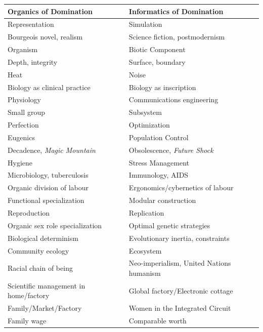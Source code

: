 \documentclass[DIV=12,%
               BCOR=10mm,%
               headinclude=false,%
               footinclude=false,open=any,%
               fontsize=11pt,%
               twoside,%
               paper=210mm:11in]%
               {scrbook}
\newcommand*{\Slash}{\slash\hspace{0pt}}
\begin{document}
\begin{table}[htbp!]
 \begin{minipage}[t]{\textwidth}
\begin{tabularx}{\textwidth}{|X|X|}
\hline
\relax  Organics of Domination   &  Informatics of Domination  \\
\hline
\relax  Representation   &  Simulation  \\
\relax  Bourgeois novel, realism   &  Science fiction, postmodernism  \\
\relax  Organism   &  Biotic Component  \\
\relax  Depth, integrity   &  Surface, boundary  \\
\relax  Heat   &  Noise  \\
\relax  Biology as clinical practice   &  Biology as inscription  \\
\relax  Physiology   &  Communications engineering  \\
\relax  Small group  &  Subsystem  \\
\relax  Perfection   &  Optimization  \\
\relax  Eugenics   &  Population Control  \\
\relax  Decadence, \emph{Magic Mountain}   &  Obsolescence, \emph{Future Shock}  \\
\relax  Hygiene   &  Stress Management  \\
\relax  Microbiology, tuberculosis   &  Immunology, AIDS  \\
\relax  Organic division of labour   &  Ergonomics\Slash{}cybernetics of labour  \\
\relax  Functional specialization   &  Modular construction  \\
\relax  Reproduction   &  Replication  \\
\relax  Organic sex role specialization   &  Optimal genetic strategies  \\
\relax  Biological determinism   &  Evolutionary inertia, constraints  \\
\relax  Community ecology   &  Ecosystem  \\
\relax  Racial chain of being   &  Neo-imperialism, United Nations humanism  \\
\relax  Scientific management in home\Slash{}factory   &  Global factory\Slash{}Electronic cottage  \\
\relax  Family\Slash{}Market\Slash{}Factory   &  Women in the Integrated Circuit  \\
\relax  Family wage   &  Comparable worth  \\

\end{tabularx}
\end{minipage}
\end{table}
\end{document}
